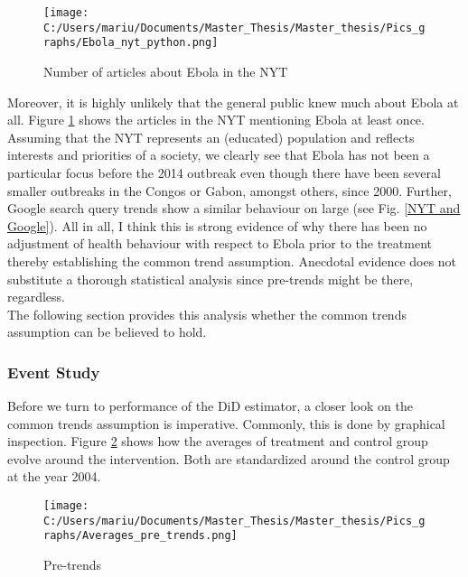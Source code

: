 \documentclass{article}
\begin{document}
\begin{figure}[!ht]
\begin{center}\caption{ Number of articles about Ebola in the NYT \label{Number of articles about Ebola in the NYT}}
\texttt{[image: C:/Users/mariu/Documents/Master\_Thesis/Master\_thesis/Pics\_graphs/Ebola\_nyt\_python.png]}\\
\end{center}
\end{figure}

Moreover, it is highly unlikely that the general public knew much about Ebola at all. Figure \ref{Number of articles about Ebola in the NYT} shows the articles in the NYT mentioning Ebola at least once. Assuming that the NYT represents an (educated) population and reflects interests and priorities of a society, we clearly see that Ebola has not been a particular focus before the 2014 outbreak even though there have been several smaller outbreaks in the Congos or Gabon, amongst others, since 2000. Further, Google search query trends show a similar behaviour on large (see Fig. \ref{NYT and Google}). All in all, I think this is strong evidence of why there has been no adjustment of health behaviour with respect to Ebola prior to the treatment thereby establishing the common trend assumption. Anecdotal evidence does not substitute a thorough statistical analysis since pre-trends might be there, regardless. \\
The following section provides this analysis whether the common trends assumption can be believed to hold.

\subsubsection{Event Study}

Before we turn to performance of the DiD estimator, a closer look on the common trends assumption is imperative. Commonly, this is done by graphical inspection. Figure \ref{Pre-trends} shows how the averages of treatment and control group evolve around the intervention. Both are standardized around the control group at the year 2004.

\begin{figure}[!ht]
\begin{center}\caption{Pre-trends \label{Pre-trends}}
\texttt{[image: C:/Users/mariu/Documents/Master\_Thesis/Master\_thesis/Pics\_graphs/Averages\_pre\_trends.png]}\\
\end{center}
\end{figure}
\end{document}
